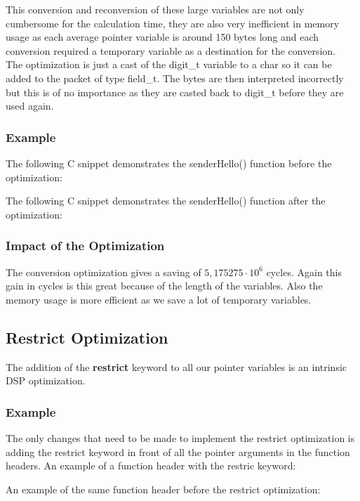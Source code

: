 \documentclass[a4paper]{article}
\begin{document}
This conversion and reconversion of these large variables are not only cumbersome for the calculation time, they are also very inefficient in memory usage as each average pointer variable is around 150 bytes long and each conversion required a temporary variable as a destination for the conversion.\\

The optimization is just a cast of the digit\_t variable to a char so it can be added to the packet of type field\_t. The bytes are then interpreted incorrectly but this is of no importance as they are casted back to digit\_t before they are used again.\\

\subsubsection{Example}
The following C snippet demonstrates the senderHello() function before the optimization:

The following C snippet demonstrates the senderHello() function after the optimization:


\subsubsection{Impact of the Optimization}
The conversion optimization gives a saving of $5,175275\cdot10^{6}$ cycles. Again this gain in cycles is this great because of the length of the variables. Also the memory usage is more efficient as we save a lot of temporary variables.

\subsection{Restrict Optimization}

The addition of the \textbf{restrict} keyword to all our pointer variables is an intrinsic DSP optimization.

\subsubsection{Example}
The only changes that need to be made to implement the restrict optimization is adding the restrict keyword in front of all the pointer arguments in the function headers. An example of a function header with the restric keyword:


An example of the same function header before the restrict optimization:
\end{document}
